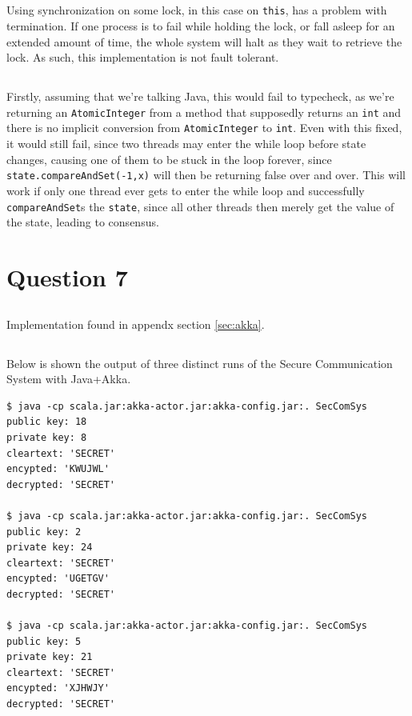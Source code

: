 \documentclass[a5paper]{article}
\begin{document}
\subsection{}
Using synchronization on some lock, in this case on \texttt{this}, has a problem with termination. If one process is to fail while holding the lock, or fall asleep for an extended amount of time,
the whole system will halt as they wait to retrieve the lock. As such, this implementation is not fault tolerant.

\subsection{}
Firstly, assuming that we're talking Java, this would fail to typecheck, as we're returning an \texttt{AtomicInteger} from a method that supposedly returns an \texttt{int} and there is no implicit conversion from \texttt{AtomicInteger} to \texttt{int}. Even with this fixed, it would still fail, since two threads may enter the while loop before state changes, causing one of them to be stuck in the loop forever, since \texttt{state.compareAndSet(-1,x)} will then be returning false over and over. This will work if only one thread ever gets to enter the while loop and successfully \texttt{compareAndSet}s the \texttt{state}, since all other threads then merely get the value of the state, leading to consensus.

\section{Question 7}
\subsection{}
Implementation found in appendx section \ref{sec:akka}.

\subsection{}
Below is shown the output of three distinct runs of the Secure Communication System with Java+Akka.
\begin{verbatim}
$ java -cp scala.jar:akka-actor.jar:akka-config.jar:. SecComSys
public key: 18
private key: 8
cleartext: 'SECRET'
encypted: 'KWUJWL'
decrypted: 'SECRET'

$ java -cp scala.jar:akka-actor.jar:akka-config.jar:. SecComSys
public key: 2
private key: 24
cleartext: 'SECRET'
encypted: 'UGETGV'
decrypted: 'SECRET'

$ java -cp scala.jar:akka-actor.jar:akka-config.jar:. SecComSys
public key: 5
private key: 21
cleartext: 'SECRET'
encypted: 'XJHWJY'
decrypted: 'SECRET'
\end{verbatim}
\end{document}
